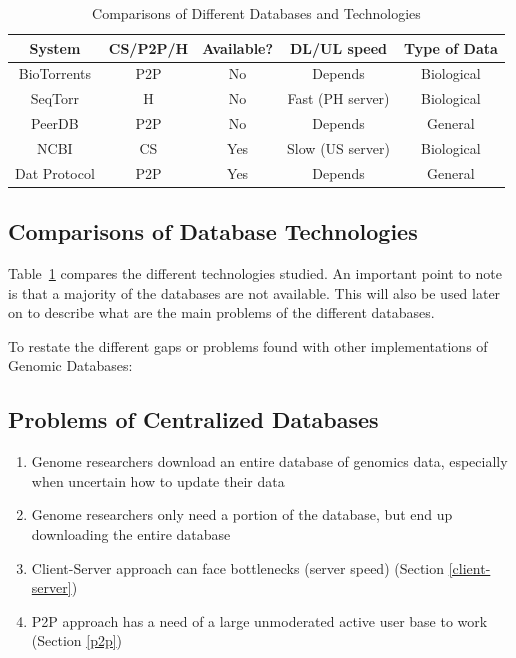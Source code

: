 \documentclass[acmsmall]{acmart}
\begin{document}
\begin{multicols}{2}
\begin{table}[ht]
    \caption{Comparisons of Different Databases and Technologies}
    \label{table:database_comparison_table}
    \begin{tabular}{ccccc}
    \toprule
    System      & CS/P2P/H & Available? & DL/UL speed & Type of Data \\ 
    \midrule
    BioTorrents & P2P           & No         & Depends                    & Biological  \\ 
    SeqTorr     & H             & No         & Fast (PH server)           & Biological       \\ 
    PeerDB      & P2P           & No         & Depends                    & General      \\ 
    NCBI        & CS            & Yes        & Slow (US server)           & Biological  \\
    Dat Protocol    & P2P      & Yes        & Depends           & General  \\ 
    \bottomrule
    \end{tabular}
\end{table} 

\subsection{Comparisons of Database Technologies} \label{compdb}

Table~\ref{table:database_comparison_table} compares the different technologies studied. An important point to note is that a majority of the databases are not available. This will also be used later on to describe what are the main problems of the different databases.

To restate the different gaps or problems found with other implementations of Genomic Databases: 
\subsection{Problems of Centralized Databases}
\begin{enumerate}
\item Genome researchers download an entire database of genomics data, especially when uncertain how to update their data
\item Genome researchers only need a portion of the database, but end up downloading the entire database
\item Client-Server approach can face bottlenecks (server speed) (Section \ref{client-server})
\item P2P approach has a need of a large unmoderated active user base to work (Section \ref{p2p})


\end{enumerate}
\end{multicols}
\end{document}
